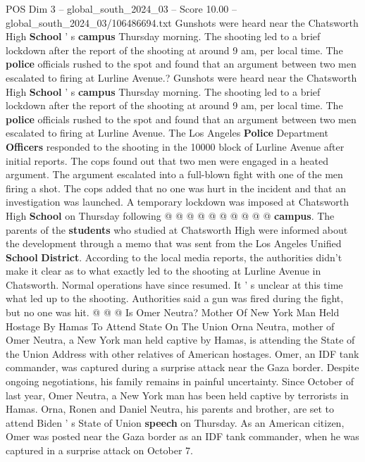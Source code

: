 \begin{textsample}{POS Dim 3 – global\_south\_2024\_03 – Score 10.00 – global\_south\_2024\_03/106486694.txt}  \label{ex:f3_pos_410}
Gunshots were heard near the Chatsworth High \textbf{School} ' s \textbf{campus} Thursday morning.
The shooting led to a brief lockdown after the report of the shooting at around 9 am, per local time.
The \textbf{police} officials rushed to the spot and found that an argument between two men escalated to firing at Lurline Avenue.?
Gunshots were heard near the Chatsworth High \textbf{School} ' s \textbf{campus} Thursday morning.
The shooting led to a brief lockdown after the report of the shooting at around 9 am, per local time.
The \textbf{police} officials rushed to the spot and found that an argument between two men escalated to firing at Lurline Avenue.
The Los Angeles \textbf{Police} Department \textbf{Officers} responded to the shooting in the 10000 block of Lurline Avenue after initial reports.
The cops found out that two men were engaged in a heated argument.
The argument escalated into a full-blown fight with one of the men firing a shot.
The cops added that no one was hurt in the incident and that an investigation was launched.
A temporary lockdown was imposed at Chatsworth High \textbf{School} on Thursday following @ @ @ @ @ @ @ @ @ @ \textbf{campus}.
The parents of the \textbf{students} who studied at Chatsworth High were informed about the development through a memo that was sent from the Los Angeles Unified \textbf{School} \textbf{District}.
According to the local media reports, the authorities didn't make it clear as to what exactly led to the shooting at Lurline Avenue in Chatsworth.
Normal operations have since resumed.
It ' s unclear at this time what led up to the shooting.
Authorities said a gun was fired during the fight, but no one was hit. @ @ @ Is Omer Neutra?
Mother Of New York Man Held Hostage By Hamas To Attend State On The Union Orna Neutra, mother of Omer Neutra, a New York man held captive by Hamas, is attending the State of the Union Address with other relatives of American hostages.
Omer, an IDF tank commander, was captured during a surprise attack near the Gaza border.
Despite ongoing negotiations, his family remains in painful uncertainty.
Since October of last year, Omer Neutra, a New York man has been held captive by terrorists in Hamas.
Orna, Ronen and Daniel Neutra, his parents and brother, are set to attend Biden ' s State of Union \textbf{speech} on Thursday.
As an American citizen, Omer was posted near the Gaza border as an IDF tank commander, when he was captured in a surprise attack on October 7.

\end{textsample}

